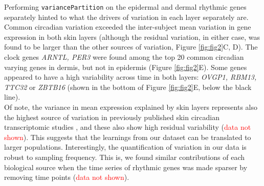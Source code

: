 {Performing \texttt{variancePartition} on the epidermal and dermal rhythmic genes separately hinted to what the drivers of variation in each layer separately are. Common circadian variation exceeded the inter-subject mean variation in gene expression in both skin layers (although the residual variation, in either case, was found to be larger than the other sources of variation, Figure \ref{fig:fig2}C, D). The clock genes \textit{ARNTL, PER3} were found among the top 20 common circadian varying genes in dermis, but not in epidermis (Figure \ref{fig:fig2}E). Some genes appeared to have a high variability across time in both layers: \textit{OVGP1, RBM13, TTC32} or \textit{ZBTB16} (shown in the bottom of Figure \ref{fig:fig2}E, below the black line). \\

Of note, the variance in mean expression explained by skin layers represents also the highest source of variation in previously published skin circadian transcriptomic studies \cite{GSE112660, GSE139300}, and these also show high residual variability (\textcolor{red}{data not shown}). This suggests that the learnings from our dataset can be translated to larger populations. Interestingly, the quantification of variation in our data is robust to sampling frequency. This is, we found similar contributions of each biological source when the time series of rhythmic genes was made sparser by removing time points (\textcolor{red}{data not shown}). \\%

}
